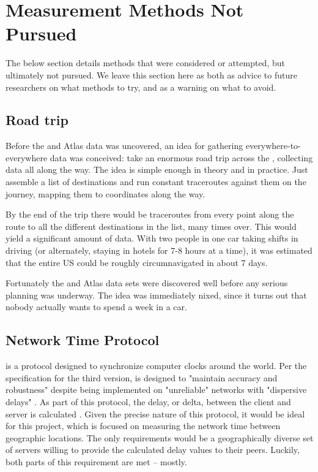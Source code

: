 \section{Measurement Methods Not Pursued}\label{sec:design_unused_methods}

The below section details methods that were considered or attempted, but ultimately not pursued. We leave this section here as both as advice to future researchers on what methods to try, and as a warning on what to avoid.

\subsection{Road trip}

Before the \caida and \ripe Atlas data was uncovered, an idea for gathering everywhere-to-everywhere data was conceived: take an enormous road trip across the \us, collecting data all along the way. The idea is simple enough in theory and in practice. Just assemble a list of destinations and run constant traceroutes against them on the journey, mapping them to \gps coordinates along the way.

By the end of the trip there would be traceroutes from every point along the route to all the different destinations in the list, many times over. This would yield a significant amount of data. With two people in one car taking shifts in driving (or alternately, staying in hotels for 7-8 hours at a time), it was estimated that the entire US could be roughly circumnavigated in about 7 days.

Fortunately the \caida and \ripe Atlas data sets were discovered well before any serious planning was underway. The idea was immediately nixed, since it turns out that nobody actually wants to spend a week in a car.

\subsection{Network Time Protocol}

\ntp is a protocol designed to synchronize computer clocks around the world. Per the specification for the third version, \ntp is designed to "maintain accuracy and robustness" despite being implemented on "unreliable" networks with "dispersive delays" \cite{rfc1305}. As part of this protocol, the delay, or delta, between the client and server is calculated \cite{rfc5905}. Given the precise nature of this protocol, it would be ideal for this project, which is focused on measuring the network time between geographic locations. The only requirements would be a geographically diverse set of \ntp servers willing to provide the calculated delay values to their peers. Luckily, both parts of this requirement are met -- mostly.

